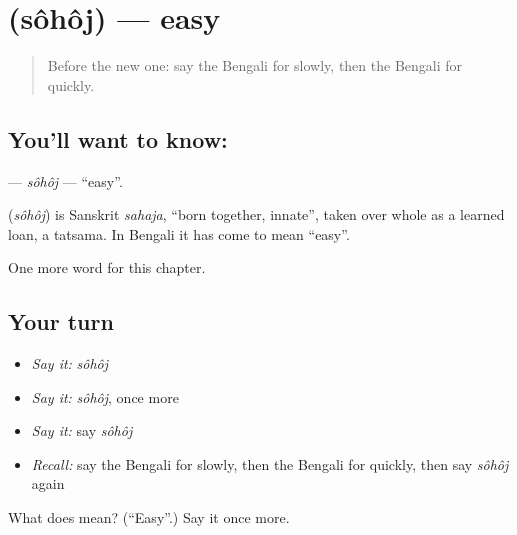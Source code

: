 \section[\texorpdfstring{\bn{সহজ} (sôhôj)}{সহজ (sôhôj)}]{ (sôhôj) — easy}

\label{lesson:BN-C73-sohoj}



\begin{quote}
Before the new one: say the Bengali for slowly, then the Bengali for quickly.
\end{quote}

\subsection*{You'll want to know: }
\textbf{} — \emph{sôhôj} — \textquotedblleft{}easy\textquotedblright{}.

\begin{cousinweb}
\textbf{} (\emph{sôhôj}) is Sanskrit \emph{sahaja}, \textquotedblleft{}born together, innate\textquotedblright{}, taken over whole as a learned loan, a tatsama. In Bengali it has come to mean \textquotedblleft{}easy\textquotedblright{}.
\end{cousinweb}

\begin{grammarlens}[title={What you've built}]
One more word for this chapter.
\end{grammarlens}

\subsection*{Your turn}
\begin{itemize}
\raggedright
  \item \emph{Say it:} \emph{sôhôj}
  \item \emph{Say it:} \emph{sôhôj}, once more
  \item \emph{Say it:} say \emph{sôhôj}
  \item \emph{Recall:} say the Bengali for slowly, then the Bengali for quickly, then say \emph{sôhôj} again
\end{itemize}

\begin{tcolorbox}[breakable,colback=teal!4,colframe=teal!35!black,title={Before you move on}]
What does  mean? (\textquotedblleft{}Easy\textquotedblright{}.) Say it once more.
\end{tcolorbox}
